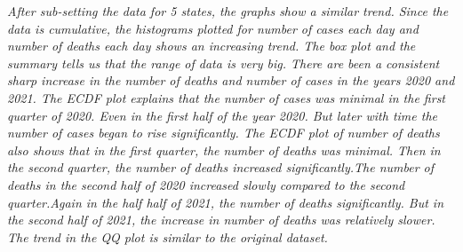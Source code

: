 \documentclass[
]{article}
\begin{document}
\emph{After sub-setting the data for 5 states, the graphs show a similar
trend. Since the data is cumulative, the histograms plotted for number
of cases each day and number of deaths each day shows an increasing
trend. The box plot and the summary tells us that the range of data is
very big. There are been a consistent sharp increase in the number of
deaths and number of cases in the years 2020 and 2021. The ECDF plot
explains that the number of cases was minimal in the first quarter of
2020. Even in the first half of the year 2020. But later with time the
number of cases began to rise significantly. The ECDF plot of number of
deaths also shows that in the first quarter, the number of deaths was
minimal. Then in the second quarter, the number of deaths increased
significantly.The number of deaths in the second half of 2020 increased
slowly compared to the second quarter.Again in the half half of 2021,
the number of deaths significantly. But in the second half of 2021, the
increase in number of deaths was relatively slower. The trend in the QQ
plot is similar to the original dataset.}
\end{document}

